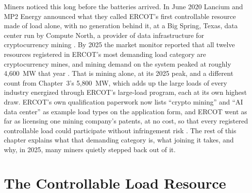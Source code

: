 Miners noticed this long before the batteries arrived. In June 2020 Lancium and MP2 Energy announced what they called ERCOT's first controllable resource made of load alone, with no generation behind it, at a Big Spring, Texas, data center run by Compute North, a provider of data infrastructure for cryptocurrency mining \autocite{lancium2020clr}. %
By 2025 the market monitor reported that all twelve resources registered in ERCOT's most demanding load category are cryptocurrency mines, and mining demand on the system peaked at roughly 4,600~MW that year \autocite{potomac2026somercot}. %
That is mining alone, at its 2025 peak, and a different count from Chapter~3's 5,800~MW, which adds up the large loads of every industry energized through ERCOT's large-load program, each at its own highest draw. %
ERCOT's own qualification paperwork now lists ``crypto mining'' and ``AI data center'' as example load types on the application form, and ERCOT went as far as licensing one mining company's patents, at no cost, so that every registered controllable load could participate without infringement risk \autocite{ercotclrtest2024,ercotlaar}. %
The rest of this chapter explains what that demanding category is, what joining it takes, and why, in 2025, many miners quietly stepped back out of it.

\section{The Controllable Load Resource}
\label{sec:clr}

